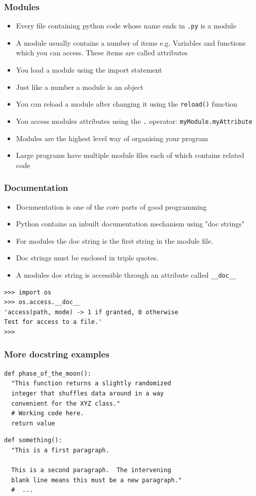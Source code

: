 \documentclass{beamer}
\begin{document}
\begin{frame}
\frametitle{Modules}
\begin{itemize}
\item Every file containing python code whose name ends in \texttt{.py} is a module
\item A module usually contains a number of items e.g. Variables and functions which you can access. These items are called attributes
\item You load a module using the import statement
\item Just like a number a module is an object
\item You can reload a module after changing it using the \texttt{reload()} function
\item You access modules attributes using the \texttt{.} operator: \texttt{myModule.myAttribute}
\item Modules are the highest level way of organising your program
\item Large programs have multiple module files each of which contains related code
\end{itemize}
\end{frame}

\begin{frame}[containsverbatim]
\frametitle{Documentation}
\begin{itemize}
\item Documentation is one of the core parts of good programming
\item Python contains an inbuilt documentation mechanism using "doc strings"
\item For modules the doc string is the first string in the module file.
\item Doc strings must be enclosed in triple quotes.
\item A modules doc string is accessible through an attribute called \texttt{\_\_doc\_\_}
\end{itemize}
\tiny
\begin{Verbatim}
>>> import os
>>> os.access.__doc__
'access(path, mode) -> 1 if granted, 0 otherwise
Test for access to a file.'
>>>
\end{Verbatim}
\normalsize
\end{frame}

\begin{frame}[containsverbatim]
\frametitle{More docstring examples}
\begin{lstlisting}
def phase_of_the_moon():
  "This function returns a slightly randomized
  integer that shuffles data around in a way
  convenient for the XYZ class."
  # Working code here.
  return value 
\end{lstlisting}
\begin{lstlisting}
def something():
  "This is a first paragraph.

  This is a second paragraph.  The intervening
  blank line means this must be a new paragraph."
  #  ... 
\end{lstlisting}
\end{frame}
\end{document}
